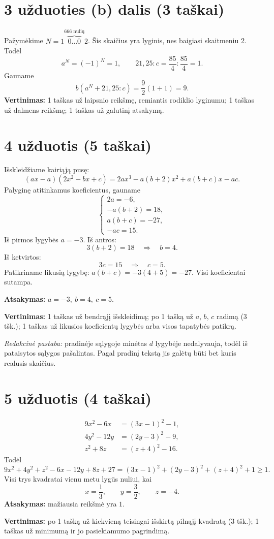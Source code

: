 \documentclass[12pt,a4paper]{exam}
\begin{document}
\section*{3 užduoties (b) dalis (3 taškai)}
Pažymėkime $N=1\overbrace{0\ldots0}^{666\text{ nulių}}2$. Šis skaičius yra lyginis, nes baigiasi skaitmeniu 2. Todėl
$$a^N=(-1)^N=1,\qquad 21{,}25:c=\frac{85}{4}:\frac{85}{4}=1.$$
Gauname
$$b(a^N+21{,}25:c)=\frac92(1+1)=\boxed9.$$
\textbf{Vertinimas:} 1 taškas už laipsnio reikšmę, remiantis rodiklio lyginumu; 1 taškas už dalmens reikšmę; 1 taškas už galutinį atsakymą.
\section*{4 užduotis (5 taškai)}
Išskleidžiame kairiąją pusę:
$$(ax-a)(2x^2-bx+c)=2ax^3-a(b+2)x^2+a(b+c)x-ac.$$
Palyginę atitinkamus koeficientus, gauname
$$\begin{cases}2a=-6,\\-a(b+2)=18,\\a(b+c)=-27,\\-ac=15.\end{cases}$$
Iš pirmos lygybės $a=-3$. Iš antros:
$$3(b+2)=18\quad\Longrightarrow\quad b=4.$$
Iš ketvirtos:
$$3c=15\quad\Longrightarrow\quad c=5.$$
Patikriname likusią lygybę: $a(b+c)=-3(4+5)=-27$. Visi koeficientai sutampa.
\par\textbf{Atsakymas:} $\boxed{a=-3,\ b=4,\ c=5}$.
\par\textbf{Vertinimas:} 1 taškas už bendrąjį išskleidimą; po 1 tašką už $a$, $b$, $c$ radimą (3 tšk.); 1 taškas už likusios koeficientų lygybės arba visos tapatybės patikrą.
\par\textit{Redakcinė pastaba:} pradinėje sąlygoje minėtas $d$ lygybėje nedalyvauja, todėl iš pataisytos sąlygos pašalintas. Pagal pradinį tekstą jis galėtų būti bet kuris realusis skaičius.
\section*{5 užduotis (4 taškai)}
\begin{align*}
9x^2-6x&=(3x-1)^2-1,\\
4y^2-12y&=(2y-3)^2-9,\\
z^2+8z&=(z+4)^2-16.
\end{align*}
Todėl
$$9x^2+4y^2+z^2-6x-12y+8z+27=(3x-1)^2+(2y-3)^2+(z+4)^2+1\geq1.$$
Visi trys kvadratai vienu metu lygūs nuliui, kai
$$x=\frac13,\qquad y=\frac32,\qquad z=-4.$$
\textbf{Atsakymas:} mažiausia reikšmė yra $\boxed1$.
\par\textbf{Vertinimas:} po 1 tašką už kiekvieną teisingai išskirtą pilnąjį kvadratą (3 tšk.); 1 taškas už minimumą ir jo pasiekiamumo pagrindimą.
\end{document}
